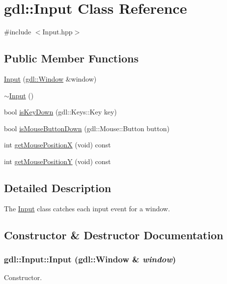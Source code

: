 \hypertarget{classgdl_1_1Input}{
\section{gdl::Input Class Reference}
\label{classgdl_1_1Input}
}


{\ttfamily \#include $<$Input.hpp$>$}\subsection*{Public Member Functions}
\begin{DoxyCompactItemize}
\item 
\hyperlink{classgdl_1_1Input_aaaec080ed208c7a0e93160e11710a6db}{Input} (\hyperlink{classgdl_1_1Window}{gdl::Window} \&window)
\item 
\hyperlink{classgdl_1_1Input_aa9c7fd004ef583434b65ddf7ebbad9bc}{$\sim$Input} ()
\item 
bool \hyperlink{classgdl_1_1Input_ae0bfa17187848fd6a1576eb1e8204230}{isKeyDown} (gdl::Keys::Key key)
\item 
bool \hyperlink{classgdl_1_1Input_a893c44e94392d6d2d3c01f5ff4263f96}{isMouseButtonDown} (gdl::Mouse::Button button)
\item 
int \hyperlink{classgdl_1_1Input_a1a9f9de83134c8ea6e62ece2163868ca}{getMousePositionX} (void) const 
\item 
int \hyperlink{classgdl_1_1Input_a8732662c038df92f1cb422973b675288}{getMousePositionY} (void) const 
\end{DoxyCompactItemize}


\subsection{Detailed Description}
The \hyperlink{classgdl_1_1Input}{Input} class catches each input event for a window. 

\subsection{Constructor \& Destructor Documentation}
\hypertarget{classgdl_1_1Input_aaaec080ed208c7a0e93160e11710a6db}{
\subsubsection[{Input}]{\setlength{\rightskip}{0pt plus 5cm}gdl::Input::Input ({\bf gdl::Window} \& {\em window})}}
\label{classgdl_1_1Input_aaaec080ed208c7a0e93160e11710a6db}
Constructor.



